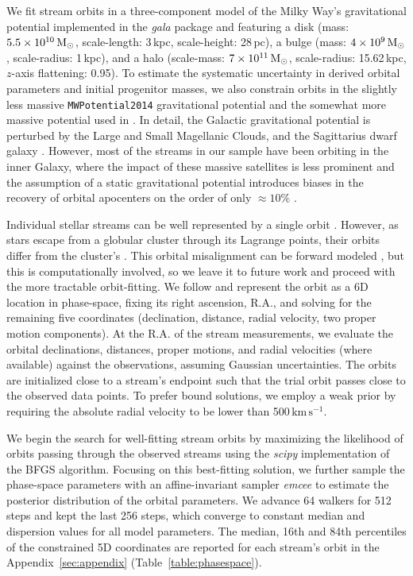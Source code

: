 \documentclass[twocolumn]{aastex63}
\newcommand{\package}[1]{\textsl{#1}}
\newcommand{\kms}{\ensuremath{\textrm{km}\,\textrm{s}^{-1}}}
\begin{document}
We fit stream orbits in a three-component model of the Milky Way's gravitational potential implemented in the \package{gala} package \citep{gala} and featuring a \citet{mn:1975} disk (mass: $5.5\times10^{10}\rm\, M_\odot$, scale-length: 3\,kpc, scale-height: 28\,pc), a \citet{hernquist:1990} bulge (mass: $4\times10^9\rm\, M_\odot$, scale-radius: 1\,kpc), and a \citet{nfw:1997} halo (scale-mass: $7\times10^{11}\rm\, M_\odot$, scale-radius: 15.62\,kpc, $z$-axis flattening: 0.95).
To estimate the systematic uncertainty in derived orbital parameters and initial progenitor masses, we also constrain orbits in the slightly less massive \texttt{MWPotential2014} gravitational potential \citep{bovy:2015} and the somewhat more massive potential used in \citet{pwb}.
In detail, the Galactic gravitational potential is perturbed by the Large and Small Magellanic Clouds, and the Sagittarius dwarf galaxy \citep{gomez:2015, erkal:2019, vasiliev:2020}.
However, most of the streams in our sample have been orbiting in the inner Galaxy, where the impact of these massive satellites is less prominent \citep{petersen:2020} and the assumption of a static gravitational potential introduces biases in the recovery of orbital apocenters on the order of only $\approx10\%$ \citep{garrow:2020}.


Individual stellar streams can be well represented by a single orbit \citep[e.g.,][]{koposov:2010, pwb, ibata:2019}.
However, as stars escape from a globular cluster through its Lagrange points, their orbits differ from the cluster's \citep{eyre:2011}.
This orbital misalignment can be forward modeled \citep{varghese:2011, bonaca:2014, sanders:2014}, but this is computationally involved, so we leave it to future work and proceed with the more tractable orbit-fitting.
We follow \citet{pwb} and represent the orbit as a 6D location in phase-space, fixing its right ascension, R.A., and solving for the remaining five coordinates (declination, distance, radial velocity, two proper motion components).
At the R.A. of the stream measurements, we evaluate the orbital declinations, distances, proper motions, and radial velocities (where available) against the observations, assuming Gaussian uncertainties.
The orbits are initialized close to a stream's endpoint such that the trial orbit passes close to the observed data points.
To prefer bound solutions, we employ a weak prior by requiring the absolute radial velocity to be lower than 500\,\kms.

We begin the search for well-fitting stream orbits by maximizing the likelihood of orbits passing through the observed streams using the \package{scipy} implementation of the BFGS algorithm.
Focusing on this best-fitting solution, we further sample the phase-space parameters with an affine-invariant sampler \package{emcee} to estimate the posterior distribution of the orbital parameters.
We advance 64 walkers for 512 steps and kept the last 256 steps, which converge to constant median and dispersion values for all model parameters.
The median, 16th and 84th percentiles of the constrained 5D coordinates are reported for each stream's orbit in the Appendix~\ref{sec:appendix} (Table~\ref{table:phasespace}).
\end{document}
